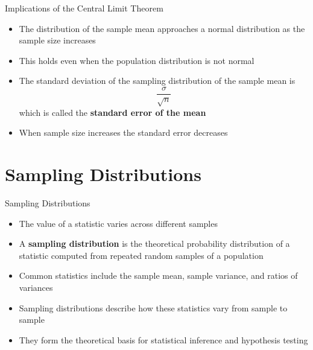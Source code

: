 \documentclass[12pt, aspectratio=169]{beamer}
\begin{document}
    \begin{frame}{Implications of the Central Limit Theorem}
        \begin{itemize}
            \item The distribution of the sample mean approaches a normal distribution as the sample size increases

            \item This holds even when the population distribution is not normal

            \item The standard deviation of the sampling distribution of the sample mean is
            \[
                \frac{\sigma}{\sqrt{n}}
            \]
            which is called the \textbf{standard error of the mean}

            \item When sample size increases the standard error decreases
        \end{itemize}
    \end{frame}


    \section{Sampling Distributions}
    
    \begin{frame}{Sampling Distributions}
        \begin{itemize}
            \item The value of a statistic varies across different samples
            \item A \textbf{sampling distribution} is the theoretical probability distribution of a statistic computed from repeated random samples of a population
            \item Common statistics include the sample mean, sample variance, and ratios of variances
            \item Sampling distributions describe how these statistics vary from sample to sample
            \item They form the theoretical basis for statistical inference and hypothesis testing
        \end{itemize}
    \end{frame}
\end{document}
